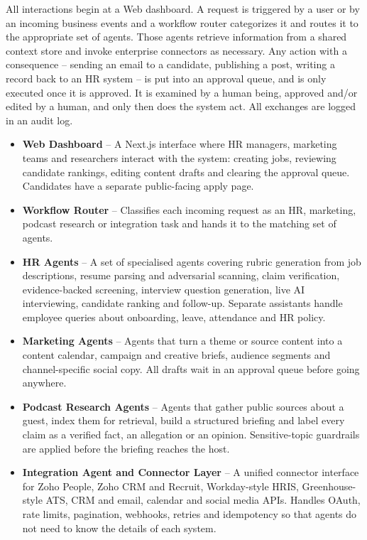 \vspace{12pt}
All interactions begin at a Web dashboard. A request is triggered by a user or by an incoming business events and a workflow router categorizes it and routes it to the appropriate set of agents. Those agents retrieve information from a shared context store and invoke enterprise connectors as necessary. Any action with a consequence -- sending an email to a candidate, publishing a post, writing a record back to an HR system -- is put into an approval queue, and is only executed once it is approved. It is examined by a human being, approved and/or edited by a human, and only then does the system act. All exchanges are logged in an audit log.
\vspace{12pt}
\begin{itemize}
  \item \textbf{Web Dashboard} -- A Next.js interface where HR managers, marketing teams and researchers interact with the system: creating jobs, reviewing candidate rankings, editing content drafts and clearing the approval queue. Candidates have a separate public-facing apply page.
  \item \textbf{Workflow Router} -- Classifies each incoming request as an HR, marketing, podcast research or integration task and hands it to the matching set of agents.
  \item \textbf{HR Agents} -- A set of specialised agents covering rubric generation from job descriptions, resume parsing and adversarial scanning, claim verification, evidence-backed screening, interview question generation, live AI interviewing, candidate ranking and follow-up. Separate assistants handle employee queries about onboarding, leave, attendance and HR policy.
  \item \textbf{Marketing Agents} -- Agents that turn a theme or source content into a content calendar, campaign and creative briefs, audience segments and channel-specific social copy. All drafts wait in an approval queue before going anywhere.
  \item \textbf{Podcast Research Agents} -- Agents that gather public sources about a guest, index them for retrieval, build a structured briefing and label every claim as a verified fact, an allegation or an opinion. Sensitive-topic guardrails are applied before the briefing reaches the host.
  \item \textbf{Integration Agent and Connector Layer} -- A unified connector interface for Zoho People, Zoho CRM and Recruit, Workday-style HRIS, Greenhouse-style ATS, CRM and email, calendar and social media APIs. Handles OAuth, rate limits, pagination, webhooks, retries and idempotency so that agents do not need to know the details of each system.

\end{itemize}
